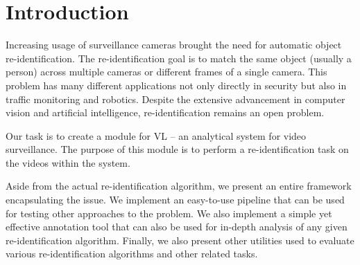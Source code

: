 \chapter*{Introduction}

Increasing usage of surveillance cameras brought the need for automatic object re-identification.  The re-identification goal is to match the same object (usually a person) across multiple cameras or different frames of a single camera. This problem has many different applications not only directly in security but also in traffic monitoring and robotics. Despite the extensive advancement in computer vision and artificial intelligence, re-identification remains an open problem.

Our task is to create a module for \gls{VL} -- an analytical system for video surveillance. The purpose of this module is to perform a re-identification task on the videos within the system.

Aside from the actual re-identification algorithm, we present an entire framework encapsulating the issue. We implement an easy-to-use pipeline that can be used for testing other approaches to the problem. We also implement a simple yet effective annotation tool that can also be used for in-depth analysis of any given re-identification algorithm. Finally, we also present other utilities used to evaluate various re-identification algorithms and other related tasks.


